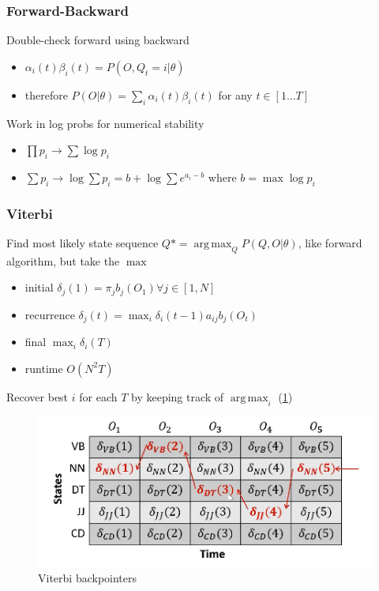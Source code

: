 \documentclass[]{article}
\DeclareMathOperator*{\argmax}{arg\,max}
\theoremstyle{definition}
\begin{document}
\subsubsection{Forward-Backward}%
\label{ssub:forward_backward}


Double-check forward using backward
\begin{itemize}
    \item $\alpha_i(t) \beta_i(t) = P(O, Q_t = i | \theta)$
    \item therefore $P(O | \theta) = \sum_i \alpha_i (t) \beta_i (t)$ for any $t \in [1\ldots T]$
\end{itemize}

Work in log probs for numerical stability
\begin{itemize}
    \item $\prod p_i \to \sum \log p_i$
    \item $\sum p_i \to \log \sum p_i = b + \log \sum e^{a_i - b}$ where $b = \max \log p_i$
\end{itemize}

\subsubsection{Viterbi}%
\label{ssub:viterbi}

Find most likely state sequence $Q* = \argmax_Q P(Q,O|\theta)$, like forward algorithm, but take the $\max$
\begin{itemize}
    \item initial $\delta_j(1) = \pi_j b_j(O_1) \forall j \in [1,N]$
    \item recurrence $\delta_j(t) = \max_i \delta_i (t-1) a_{ij} b_j(O_t)$
    \item final $\max_i \delta_i(T)$
    \item runtime $O(N^2T)$
\end{itemize}

Recover best $i$ for each $T$ by keeping track of $\argmax_i$ (\ref{fig:viterbi-alg})

\begin{figure}[ht]
    \centering
    \includegraphics[width=0.8\linewidth]{comp550/viterbi.png}
    \caption{Viterbi backpointers}
    \label{fig:viterbi-alg}
\end{figure}
\end{document}

